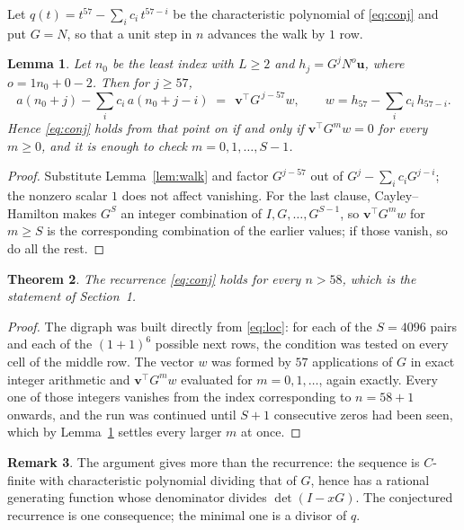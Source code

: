 \documentclass[11pt,a4paper]{article}
\theoremstyle{plain}
\newtheorem{theorem}{Theorem}
\newtheorem{lemma}[theorem]{Lemma}
\theoremstyle{definition}
\newtheorem{remark}[theorem]{Remark}
\begin{document}
Let $q(t)=t^{57}-\sum_i c_i\,t^{57-i}$ be the characteristic polynomial of
\eqref{eq:conj} and put $G=N$, so that a unit step in $n$ advances the walk by
$1$ row.

\begin{lemma}\label{lem:crit}
Let $n_0$ be the least index with $L\ge2$ and $h_j=G^{j}N^{o}\mathbf{u}$, where
$o=1n_0+0-2$. Then for $j\ge57$,
\[
a(n_0+j)-\sum_i c_i\,a(n_0+j-i)\;=\;\,\mathbf{v}^{\!\top}G^{\,j-57}w,
\qquad w=h_{57}-\sum_i c_i\,h_{57-i} .
\]
Hence \eqref{eq:conj} holds from that point on if and only if
$\mathbf{v}^{\!\top}G^{m}w=0$ for every $m\ge0$, and it is enough to check
$m=0,1,\dots,S-1$.
\end{lemma}

\begin{proof}
Substitute Lemma~\ref{lem:walk} and factor $G^{j-57}$ out of
$G^{j}-\sum_ic_iG^{j-i}$; the nonzero scalar $1$ does not affect
vanishing. For the last clause, Cayley--Hamilton makes $G^{S}$ an integer combination of
$I,G,\dots,G^{S-1}$, so $\mathbf{v}^{\!\top}G^{m}w$ for $m\ge S$ is the corresponding
combination of the earlier values; if those vanish, so do all the rest.
\end{proof}

\begin{theorem}
The recurrence \eqref{eq:conj} holds for every $n>58$, which is the statement of
Section~1.
\end{theorem}

\begin{proof}
The digraph was built directly from \eqref{eq:loc}: for each of the $S=4096$ pairs and each
of the $(1+1)^{6}$ possible next rows, the condition was tested on every cell of
the middle row. The vector $w$ was formed by $57$ applications of $G$ in exact integer
arithmetic and $\mathbf{v}^{\!\top}G^{m}w$ evaluated for $m=0,1,\dots$, again exactly.
Every one of those integers vanishes from the index corresponding to $n=58+1$ onwards,
and the run was continued until $S+1$ consecutive zeros had been seen, which by
Lemma~\ref{lem:crit} settles every larger $m$ at once.
\end{proof}

\begin{remark}
The argument gives more than the recurrence: the sequence is $C$-finite with characteristic
polynomial dividing that of $G$, hence has a rational generating function whose denominator
divides $\det(I-xG)$. The conjectured recurrence is one consequence; the minimal one is a
divisor of $q$.
\end{remark}
\end{document}
